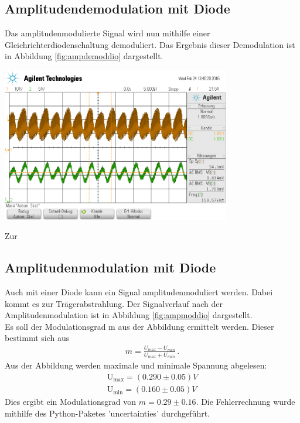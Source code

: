 \documentclass[]{scrartcl}
\begin{document}
\subsection{Amplitudendemodulation mit Diode}
Das amplitudenmodulierte Signal wird nun mithilfe einer Gleichrichterdiodenschaltung demoduliert. Das Ergebnis dieser Demodulation ist in Abbildung \ref{fig:ampdemoddio} dargestellt. 
\begin{center}
	\includegraphics[width=10cm]{images/ampdemoddio.png}
	\label{fig:ampdemoddio}
\end{center}
Zur\subsection{Amplitudenmodulation mit Diode}
Auch mit einer Diode kann ein Signal amplitudenmoduliert werden. Dabei kommt es zur Trägerabstrahlung. Der Signalverlauf nach der Amplitudenmodulation ist in Abbildung \ref{fig:ampmoddio} dargestellt. \\
Es soll der Modulationsgrad m aus der Abbildung ermittelt werden. Dieser bestimmt sich aus
\begin{align}
m=\frac{U_{max}-U_{min}}{U_{max}+U_{min}}\,.
\label{eq:modgrad}
\end{align}
Aus der Abbildung werden maximale und minimale Spannung abgelesen:
\begin{align*}
\text{U}_{\text{max}}=(0.290\pm 0.05)\si{V} \\
\text{U}_{\text{min}}=(0.160\pm 0.05)\si{V}
\end{align*}
Dies ergibt ein Modulationsgrad von $m=0.29\pm0.16$. Die Fehlerrechnung wurde mithilfe des Python-Paketes 'uncertainties' durchgeführt. \\
\end{document}

